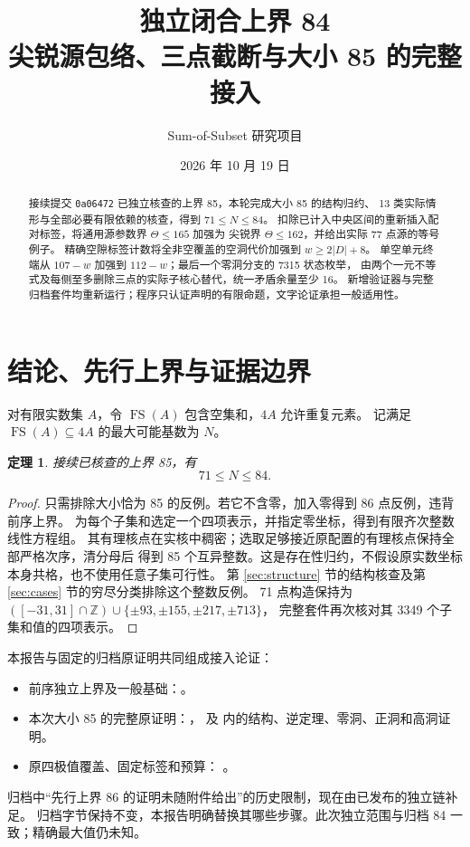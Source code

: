 \documentclass[11pt,a4paper]{article}
\title{独立闭合上界 84\\\large 尖锐源包络、三点截断与大小 85 的完整接入}
\author{Sum-of-Subset 研究项目}
\date{2026 年 10 月 19 日}
\newcommand{\FS}{\operatorname{FS}}
\newcommand{\Z}{\mathbb Z}
\newtheorem{theorem}{定理}[section]
\begin{document}
\maketitle
\begin{abstract}
接续提交 \texttt{0a06472} 已独立核查的上界 85，本轮完成大小 85 的结构归约、
13 类实际情形与全部必要有限依赖的核查，得到 $71\le N\le84$。
扣除已计入中央区间的重新插入配对标签，将通用源参数界 $\Theta\le165$ 加强为
尖锐界 $\Theta\le162$，并给出实际 77 点源的等号例子。
精确空隙标签计数将全非空覆盖的空洞代价加强到 $w\ge2|D|+8$。
单空单元终端从 $107-w$ 加强到 $112-w$；最后一个零洞分支的 7315 状态枚举，
由两个一元不等式及每侧至多删除三点的实际子核心替代，统一矛盾余量至少 16。
新增验证器与完整归档套件均重新运行；程序只认证声明的有限命题，文字论证承担一般适用性。
\end{abstract}

\section{结论、先行上界与证据边界}
对有限实数集 $A$，令 $\FS(A)$ 包含空集和，$4A$ 允许重复元素。
记满足 $\FS(A)\subseteq4A$ 的最大可能基数为 $N$。
\begin{theorem}
接续已核查的上界 85，有
\[\boxed{71\le N\le84.}\]
\end{theorem}
\begin{proof}
只需排除大小恰为 85 的反例。若它不含零，加入零得到 86 点反例，违背前序上界。
为每个子集和选定一个四项表示，并指定零坐标，得到有限齐次整数线性方程组。
其有理核点在实核中稠密；选取足够接近原配置的有理核点保持全部严格次序，清分母后
得到 85 个互异整数。这是存在性归约，不假设原实数坐标本身共格，也不使用任意子集可行性。
第 \ref{sec:structure} 节的结构核查及第 \ref{sec:cases} 节的穷尽分类排除这个整数反例。
71 点构造保持为 $([-31,31]\cap\Z)\cup\{\pm93,\pm155,\pm217,\pm713\}$，
完整套件再次核对其 3349 个子集和值的四项表示。
\end{proof}

本报告与固定的归档原证明共同组成接入论证：
\begin{itemize}
\item 前序独立上界及一般基础：。
\item 本次大小 85 的完整原证明：，
及  内的结构、逆定理、零洞、正洞和高洞证明。
\item 原四极值覆盖、固定标签和预算：
。
\end{itemize}
归档中“先行上界 86 的证明未随附件给出”的历史限制，现在由已发布的独立链补足。
归档字节保持不变，本报告明确替换其哪些步骤。此次独立范围与归档 84 一致；精确最大值仍未知。
\end{document}
